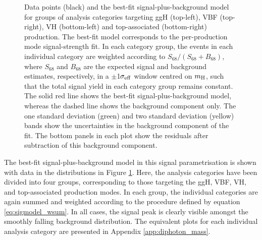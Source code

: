 \begin{figure}
  \caption[Observed diphoton mass distribution for groups of categories targeting different Higgs boson production modes]
  {
    Data points (black) and the best-fit signal-plus-background model for groups of analysis categories targeting ggH (top-left), VBF (top-right), VH (bottom-left) and top-associated (bottom-right) production. The best-fit model corresponds to the per-production mode signal-strength fit. In each category group, the events in each individual category are weighted according to $S_{68}/(S_{68}+B_{68})$, where $S_{68}$ and $B_{68}$ are the expected signal and background estimates, respectively, in a $\pm$1$\sigma_{\rm{eff}}$ window centred on $m_{\rm{H}}$, such that the total signal yield in each category group remains constant. The solid red line shows the best-fit signal-plus-background model, whereas the dashed line shows the background component only. The one standard deviation (green) and two standard deviation (yellow) bands show the uncertainties in the background component of the fit. The bottom panels in each plot show the residuals after subtraction of this background component.
  }
  \label{fig:sb_mu}
\end{figure}

The best-fit signal-plus-background model in this signal parametrisation is shown with data in the \mgg distributions in Figure \ref{fig:sb_mu}. Here, the analysis categories have been divided into four groups, corresponding to those targeting the ggH, VBF, VH, and top-associated production modes. In each group, the individual categories are again summed and weighted according to the procedure defined by equation \ref{eq:sigmodel_wsum}. In all cases, the signal peak is clearly visible amongst the smoothly falling background distribution. The equivalent plots for each individual analysis category are presented in Appendix \ref{app:diphoton_mass}.

